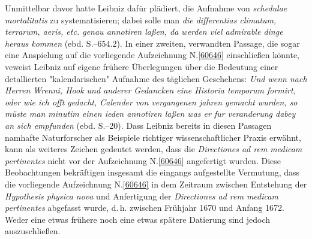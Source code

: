 Unmittelbar davor hatte Leibniz dafür plädiert, die Aufnahme von \textit{schedulae mortalitatis} zu systematisieren; dabei solle man \textit{die differentias climatum, terrarum, aeris, etc. genau annotiren laßen, da werden viel admirable dinge heraus kommen} (ebd. S.--654.2).\cite{01131}
\pend%
\pstart%
In einer zweiten, verwandten Passage, die sogar eine Anspielung auf die vorliegende Aufzeichnung N.\;\ref{60646} einschließen könnte, veweist Leibniz auf eigene frühere Überlegungen über die Bedeutung einer detallierten "kalendarischen" Aufnahme des täglichen Geschehens:
\textit{Und wenn nach Herren Wrenni, Hook und anderer Gedancken eine Historia temporum formirt, oder wie ich offt gedacht, Calender von vergangenen jahren gemacht wurden, so müste man minutim einen ieden annotiren laßen was er fur veranderung dabey an sich empfunden} (ebd. S.--20).\cite{01131}
Dass Leibniz bereits in diesen Passagen %
namhafte Naturforscher als Beispiele richtiger wissenschaftlicher Praxis erwähnt, kann als weiteres Zeichen gedeutet werden, dass die \textit{Directiones ad rem medicam pertinentes}\cite{01131} nicht vor der Aufzeichnung N.\;\ref{60646} angefertigt wurden.
\pend%
\pstart%
Diese Beobachtungen bekräftigen insgesamt die eingangs aufgestellte Vermutung, dass die vorliegende Aufzeichnung N.\;\ref{60646} in dem Zeitraum zwischen Entstehung der \textit{Hypothesis physica nova}\cite{00256} und Anfertigung der \textit{Directiones ad rem medicam pertinentes} abgefasst wurde, d.\,h. zwischen Frühjahr 1670 und Anfang 1672.
Weder eine etwas frühere noch eine etwas spätere Datierung sind jedoch auszuschließen.
\pend%
%
\frenchspacing%
\normalsize%
